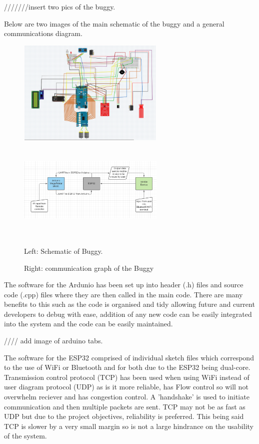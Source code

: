 \documentclass[8pt, a4paper]{article}
\begin{document}
///////insert two pics of the buggy.  


Below are two images of the main schematic of the buggy and a general communications diagram. 
\begin{figure}[h]
\includegraphics[height=5cm, width=7.0cm]{schematic}
\includegraphics[height=5cm, width=7.0cm]{Arch}
\caption{Left: Schematic of Buggy.}
\caption{Right: communication graph of the Buggy}
\end{figure}

The software for the Ardunio has been set up into header (.h) files and source code (.cpp) files where they are then called in the main code. There are many benefits to this such as the code is organised and tidy allowing future and current developers to debug with ease, addition of any new code can be easily integrated into the system and the code can be easily maintained. 

//// add image of arduino tabs.


The software for the ESP32 comprised of individual sketch files which correspond to the use of WiFi or Bluetooth and for both due to the ESP32 being dual-core. Transmission control protocol (TCP) has been used when using WiFi instead of user diagram protocol (UDP) as is it more reliable, has Flow control so will not overwhelm reciever and has congestion control. A 'handshake' is used to initiate communication and then multiple packets are sent. TCP may not be as fast as UDP but due to the project objectives, reliability is preferred. This being said TCP is slower by a very small margin so is not a large hindrance on the usability of the system. 
 
\end{document}
